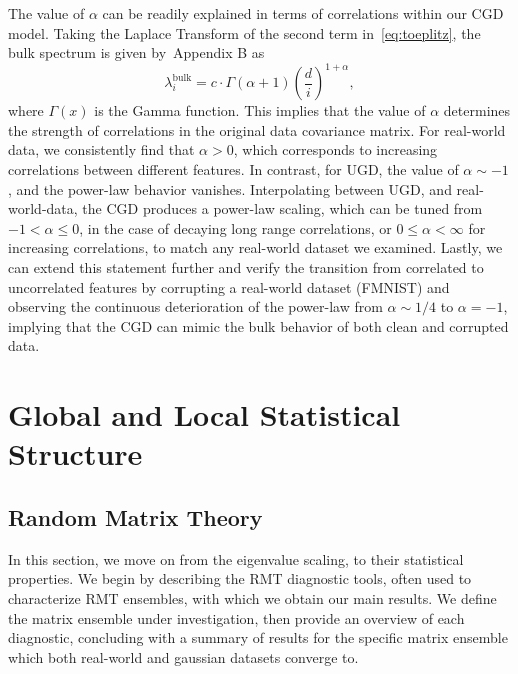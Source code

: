 \documentclass{article}
\begin{document}
The value of $\alpha$ can be readily explained in terms of correlations within our CGD model. Taking the Laplace Transform of the second term in~\cref{eq:toeplitz}, the bulk spectrum is given by~Appendix B as
\begin{equation}
    \lambda_i^\mathrm{bulk} = 
    c \cdot 
\Gamma (\alpha +1) \left(\frac{d}{ i }\right)^{1+\alpha},
\end{equation}
where $\Gamma(x)$ is the Gamma function. 
%
This implies that the value of $\alpha$ determines the strength of correlations in the original data covariance matrix.
For real-world data, we consistently find that $\alpha>0$, which corresponds to increasing correlations between different features.
In contrast, for UGD, the value of $\alpha \sim -1$, and the power-law behavior vanishes. Interpolating between UGD, and real-world-data, the CGD produces a power-law scaling, which can be tuned from $-1 < \alpha \leq 0$, in the case of decaying long range correlations, or $0 \leq \alpha < \infty$ for increasing correlations, to match any real-world dataset we examined. Lastly, we can extend this statement further and verify the transition from correlated to uncorrelated features by corrupting a real-world dataset (FMNIST) and observing the continuous deterioration of the power-law from $\alpha \sim 1/4$ to $\alpha = -1$, implying that the CGD can mimic the bulk behavior of both clean and corrupted data.




\section{Global and Local Statistical Structure}

\subsection{Random Matrix Theory}
\label{theory}



In this section, we move on from the eigenvalue scaling, to their statistical properties. We begin by describing the RMT diagnostic tools, often used to characterize RMT ensembles, with which we obtain our main results. We define the matrix ensemble under investigation, then provide an overview of each diagnostic, concluding with a summary of results for the specific matrix ensemble which both real-world and gaussian datasets converge to.
\end{document}
